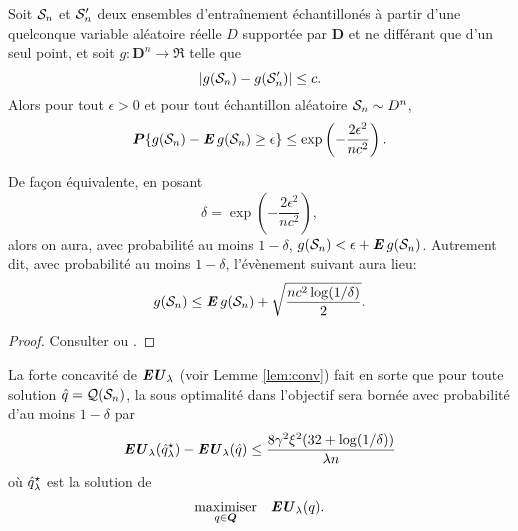 \begin{lemme}
  \label{lem:mcdiarmid}
  Soit $\S_n$ et $\S_n'$ deux ensembles d'entraînement échantillonés à partir d'une
  quelconque variable aléatoire réelle $D$ supportée par $\bm D$ et ne
  différant que d'un seul point, et soit $g:{\bm D}^n\to\Re$ telle que
  \begin{equation}
    |g(\S_n) - g(\S_n')| \leq c.
  \end{equation}
  Alors pour tout $\epsilon>0$ et pour tout échantillon aléatoire $\S_n \sim D^n$,
  \begin{equation}
    \pp\{g(\S_n) - \E g(\S_n) \geq \epsilon\} \leq \exp\left(-\frac{2\epsilon^2}{nc^2}\right).
  \end{equation}
\end{lemme}

\begin{rem}
  De façon équivalente, en posant
  \begin{equation}
    \delta = \exp\left(-\frac{2\epsilon^2}{nc^2}\right),
  \end{equation}
  alors on aura, avec probabilité au moins $1-\delta$, $g(\S_n) < \epsilon + \E g(\S_n)$. Autrement
  dit, avec probabilité au moins $1-\delta$, l'évènement suivant aura lieu:
  \begin{equation}
    g(\S_n) \leq \E g(\S_n) + \sqrt{\frac{nc^2\log(1/\delta)}{2}}.
  \end{equation}
\end{rem}

\begin{proof}
  Consulter \cite{mohri2012foundations} ou \cite{boucheron2013concentration}.
\end{proof}

\begin{lemme}
  \label{lem:ss}
  La forte concavité de $\EU_\lambda$ (voir Lemme \ref{lem:conv}) fait en sorte que pour toute
  solution $\qh = \alg(\S_n)$, la sous optimalité dans l'objectif sera bornée avec
  probabilité d'au moins $1-\delta$ par
  \begin{equation}
    \EU_\lambda(\qh^\star_\lambda) - \EU_\lambda(\qh) \leq \frac{8\gamma^2\xi^2(32+\log(1/\delta))}{\lambda n}
  \end{equation}
  où $\qh^\star_\lambda$ est la solution de
  \begin{equation}
    \maximizeEquation[q \in \Q]{\EU_\lambda(q).}
  \end{equation}
\end{lemme}

